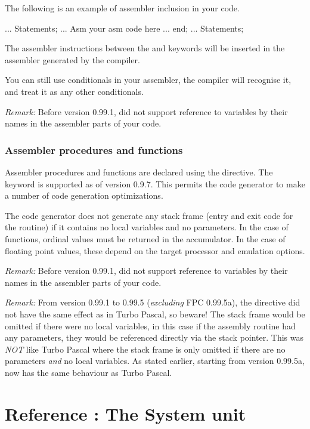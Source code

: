 \documentclass{report}
\begin{document}
The following is an example of assembler inclusion in your code.
\begin{listing}
 ...
 Statements;
 ...
 Asm
   your asm code here
   ...
 end;
 ...
 Statements;
\end{listing}

The assembler instructions between the  and  keywords will
be inserted in the assembler generated by the compiler.

You can still use conditionals in your assembler, the compiler will
recognise it, and treat it as any other conditionals.

\emph{ Remark: } Before version 0.99.1, \fpc did not support
reference to variables by their names in the assembler parts of your code.

\section{Assembler procedures and functions}

Assembler procedures and functions are declared using the
 directive. The  keyword is supported
as of version 0.9.7. This permits the code generator to make a number
of code generation optimizations.

The code generator does not generate any stack frame (entry and exit
code for the routine) if it contains no local variables and no
parameters. In the case of functions, ordinal values must be returned
in the accumulator. In the case of floating point values, these depend
on the target processor and emulation options.

\emph{ Remark: } Before version 0.99.1, \fpc did not support
reference to variables by their names in the assembler parts of your code.

\emph{ Remark: } From version 0.99.1 to 0.99.5 (\emph{excluding}
FPC 0.99.5a), the  directive did not have the
same effect as in Turbo Pascal, so beware! The stack frame would be
omitted if there were no local variables, in this case if the assembly
routine had any parameters, they would be referenced directly via the stack
pointer. This was \emph{ NOT} like Turbo Pascal where the stack frame is only
omitted if there are no parameters \emph{ and } no local variables. As
stated earlier, starting from version 0.99.5a, \fpc now has the same
behaviour as Turbo Pascal.


%
%
\part{Reference : The System unit}
\end{document}
